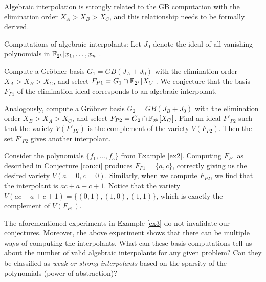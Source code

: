 
Algebraic interpolation is strongly related
to the GB computation with the elimination order $X_A>X_B>X_C$, and
this relationship needs to be formally derived. 

\begin{Conjecture} \label{con:ci}
Computations of algebraic interpolants: Let $J_0$ denote the ideal of
all vanishing polynomials in ${\mathbb{F}}_{2^k}[x_1,\dots,x_n]$.
\bi
\item  Compute a Gr\"obner basis $G_1 = GB(J_A + J_0)$ 
with the elimination order $X_A > X_B > X_C$, and select
$F_{P1}=G_1\cap{\mathbb{F}}_{2^k}[X_C]$. We conjecture that the \Grobner
basis $F_{P1}$ of the elimination ideal corresponds to an algebraic
interpolant. 

\item Analogously, compute a Gr\"obner basis $G_2 = GB(J_B + J_0)$ 
with the elimination order $X_B > X_A > X_C$, and select
$F_{P2}=G_2\cap{\mathbb{F}}_{2^k}[X_C]$. Find an ideal $F'_{P2}$ such that
the variety $V(F'_{P2})$ is the complement of the variety
$V(F_{P2})$. Then the set $F'_{P2}$ gives another interpolant.
\ei
\end{Conjecture}


\begin{Example}\label{ex3}
Consider the polynomials $\{f_1, \dots,f_5\}$ from Example
\ref{ex2}. Computing $F_{P1}$ as described in Conjecture \ref{con:ci} 
produces $F_{P1} = \{a, c\}$, correctly giving us the desired variety
$V(a = 0, c = 0)$. Similarly, when we compute $F_{P2}$, we find that
the interpolant is $ac + a + c + 1$. Notice that the variety 
$V(ac+a+c+1)=\{(0,1), (1,0), (1,1)\}$, which is exactly the complement
of $V(F_{P1})$.  
\end{Example}

The aforementioned experiments in Example \ref{ex3} do not invalidate
our conjectures. Moreover, the above experiment shows that there can be
multiple ways of computing the interpolants. What can these \Grobner
basis computations tell us about the number of valid algebraic
interpolants for any given problem? Can they be classified as {\it weak
  or strong interpolants} based on the sparsity of the polynomials
(power of abstraction)? 

